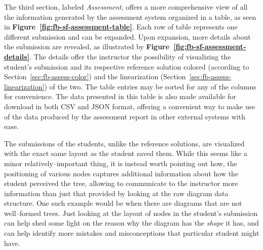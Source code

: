 \begin{chapterBody}
The third section, labeled \textit{Assessment}, offers a more comprehensive
view of all the information generated by the assessment system organized in
a table, as seen in \textbf{Figure~\ref{fig:fb-sf-assessment-table}}. Each
row of table represents one different submission and can be expanded.
Upon expansion, more details about the submission are revealed, as
illustrated by \textbf{Figure~\ref{fig:fb-sf-assessment-details}}. The
details offer the instructor the possibility of visualizing the student's
submission and its respective reference solution colored (according to
Section~\ref{sec:fb-assess-color}) and the linearization 
(Section~\ref{sec:fb-assess-linearization}) of the two. The table entries
may be sorted for any of the columns for convenience. The data presented
in this table is also made available for download in both CSV and JSON format,
offering a convenient way to make use of the data produced by the assessment
report in other external systems with ease.

The submissions of the students, unlike the reference solutions, are
visualized with the exact same layout as the student saved them. While this
seems like a minor relatively–important thing, it is instead worth pointing
out how, the positioning of various nodes captures additional information
about how the student perceived the tree, allowing to communicate to the
instructor more information than just that provided by looking at the raw
diagram data  structure. One such example would be when there are diagrams
that are not well–formed trees. Just looking at the layout of nodes in the
student's submission can help shed some light on the reason why the diagram
has the \textit{shape} it has, and can help identify more mistakes and
misconceptions that particular student might have.


\end{chapterBody}
